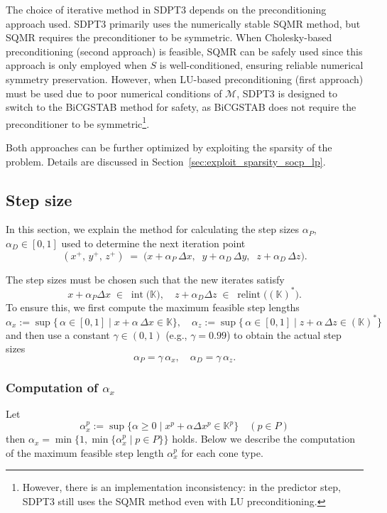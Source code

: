 The choice of iterative method in SDPT3 depends on the preconditioning approach used.
SDPT3 primarily uses the numerically stable SQMR method, but SQMR requires the preconditioner to be symmetric.
When Cholesky-based preconditioning (second approach) is feasible, SQMR can be safely used since this approach is only employed when $S$ is well-conditioned, ensuring reliable numerical symmetry preservation.
However, when LU-based preconditioning (first approach) must be used due to poor numerical conditions of $\mathcal{M}$, SDPT3 is designed to switch to the BiCGSTAB method for safety, as BiCGSTAB does not require the preconditioner to be symmetric\footnote{However, there is an implementation inconsistency: in the predictor step, SDPT3 still uses the SQMR method even with LU preconditioning.}.

Both approaches can be further optimized by exploiting the sparsity of the problem. 
Details are discussed in Section~\ref{sec:exploit_sparsity_socp_lp}.



\subsection{Step size} \label{sec:step_size}
In this section, we explain the method for calculating the step sizes $\alpha_P$, $\alpha_D \in [0, 1]$ used to determine the next iteration point 
\[
  (x^+,\,y^+,\,z^+) 
  \;=\; 
  \bigl(x + \alpha_P\,\Delta x,\;\; y + \alpha_D\,\Delta y,\;\; z + \alpha_D\,\Delta z\bigr).
\]

The step sizes must be chosen such that the new iterates satisfy
\[
  x + \alpha_P \Delta x \;\in\; \operatorname{int}\bigl(\mathbb{K}\bigr),
  \quad
  z + \alpha_D \Delta z \;\in\; \operatorname{relint}\bigl((\mathbb{K})^*\bigr).
\]
To ensure this, we first compute the maximum feasible step lengths
\[
  \alpha_x  := \sup \bigl\{\,\alpha \in [0,1] \mid x + \alpha \,\Delta x \in \mathbb{K}\bigr\},
  \quad
  \alpha_z  := \sup \bigl\{\,\alpha \in [0,1] \mid z + \alpha \,\Delta z \in (\mathbb{K})^*\bigr\}
\]
and then use a constant $\gamma\in(0,1)$ (e.g., $\gamma=0.99$) to obtain the actual step sizes
\[
  \alpha_P 
    = \gamma \,\alpha_x, 
  \quad
  \alpha_D 
    = \gamma \,\alpha_z.
\]

\subsubsection{Computation of $\alpha_x$}
Let \[
  \alpha^p_x:=\sup\{\alpha \geq 0 \mid x^p + \alpha \Delta x^p \in \mathbb{K}^p\} \quad (p\in P)
\]
then $\alpha_x = \min\{1, \min\{\alpha^p_x \mid p \in P\}\}$ holds.
Below we describe the computation of the maximum feasible step length $\alpha^p_x$ for each cone type.

